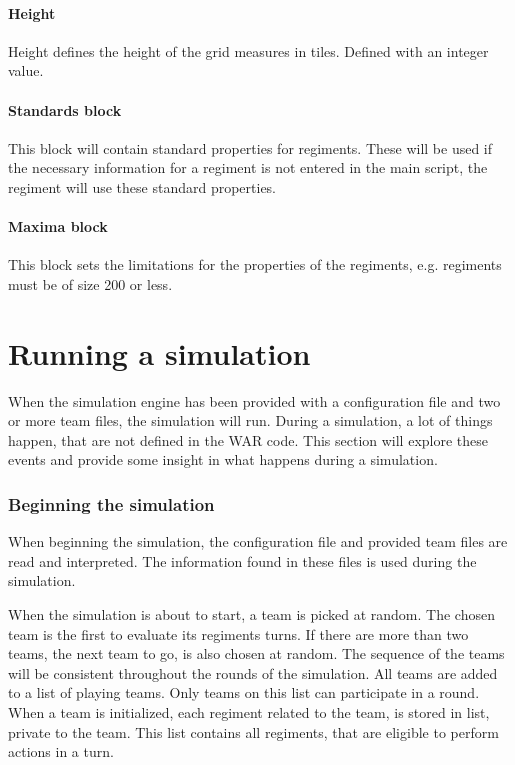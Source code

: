 		\paragraph{Height}
		Height defines the height of the grid measures in tiles.
		Defined with an integer value.
		
		\paragraph{Standards block}
		This block will contain standard properties for regiments. These will be used if the necessary 
		information for a regiment is not entered in the main script, the regiment will use these standard properties.
		
		\paragraph{Maxima block}
		This block sets the limitations for the properties of the regiments, e.g. regiments must be of size 200 or less.

\section{Running a simulation}
	When the simulation engine has been provided with a configuration file and two or more team files, the simulation will run. During a simulation, a lot of things happen, that are not defined in the WAR code. This section will explore these events and provide some insight in what happens during a simulation.
	
		\subsubsection{Beginning the simulation}
		When beginning the simulation, the configuration file and provided team files are read and interpreted. The information found in these files is used during the simulation. 
		
When the simulation is about to start, a team is picked at random. The chosen team is the first to evaluate its regiments turns. If there are more than two teams, the next team to go, is also chosen at random. The sequence of the teams will be consistent throughout the rounds of the simulation. All teams are added to a list of playing teams. Only teams on this list can participate in a round. When a team is initialized, each regiment related to the team, is stored in list, private to the team. This list contains all regiments, that are eligible to perform actions in a turn. 

